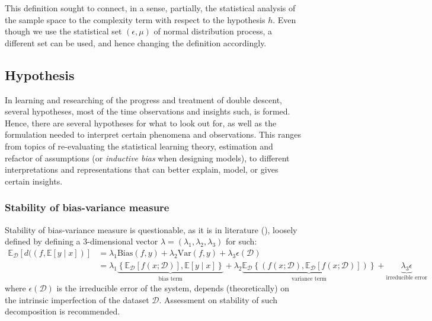 \documentclass[10pt]{article} %
\begin{document}
This definition sought to connect, in a sense, partially, the statistical analysis of the sample space to the complexity term with respect to the hypothesis $h$. Even though we use the statistical set $(\epsilon,\mu)$ of normal distribution process, a different set can be used, and hence changing the definition accordingly. 



\clearpage

\subsection{Hypothesis}

In learning and researching of the progress and treatment of double descent, several hypotheses, most of the time observations and insights such, is formed. Hence, there are several hypotheses for what to look out for, as well as the formulation needed to interpret certain phenomena and observations. This ranges from topics of re-evaluating the statistical learning theory, estimation and refactor of assumptions (or \textit{inductive bias} when designing models), to different interpretations and representations that can better explain, model, or gives certain insights.  
\subsubsection{Stability of bias-variance measure}
Stability of bias-variance measure is questionable, as it is in literature (\cite{domingos_unifeid_2000}), loosely defined by defining a 3-dimensional vector $\lambda=(\lambda_{1},\lambda_{2},\lambda_{3})$ for such: 
\noindent 
\begin{equation*}
        \begin{split}
            \mathbb{E}_{\mathcal{D}} \left[d((f,\mathbb{E}[y\mid x])\right] & = \lambda_{1} \mathrm{Bias}(f,y) + \lambda_{2}\mathrm{Var}(f,y)+ \lambda_{3}\epsilon(\mathcal{D})\\ 
            & = \lambda_{1}\underbrace{\left\{ \mathbb{E}_{\mathcal{D}}[f(x;\mathcal{D})] , \mathbb{E}[y\mid x] \right\}}_{\text{bias term}} +\lambda_{2} \underbrace{\mathbb{E}_{\mathcal{D}} \left\{(f(x;\mathcal{D}), \mathbb{E}_{\mathcal{D}}[f(x;\mathcal{D})])\right\}}_{\text{variance term}} +\underbrace{\lambda_{3}\epsilon}_{\text{irreducible error}}
        \end{split}
\end{equation*}
where $\epsilon(\mathcal{D})$ is the irreducible error of the system, depends (theoretically) on the intrinsic imperfection of the dataset $\mathcal{D}$. Assessment on stability of such decomposition is recommended. 
\end{document}

